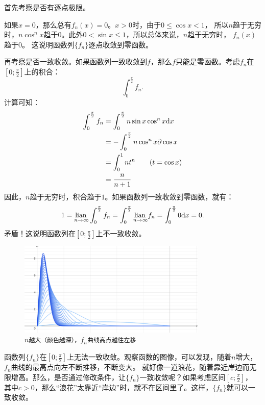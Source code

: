 \documentclass[12pt,UTF8]{ctexbook}
\begin{document}
\begin{so}
    首先考察是否有逐点极限。

    如果$x = 0$，那么总有$f_n(x) = 0$。$x > 0$时，由于$0\leqslant\cos{x}<1$，
    所以$n$趋于无穷时，$n\cos^n{x}$趋于$0$。此外$0 < \sin{x} \leqslant 1$，所以总体来说，$n$趋于无穷时，
    $f_n(x)$趋于$0$。
    这说明函数列$\{f_n\}$逐点收敛到零函数。

    再考察是否一致收敛。如果函数列一致收敛到$f$，那么$f$只能是零函数。考虑$f_n$在$\left[0;\frac{\pi}{2}\right]$上的积合：
    $$ \int_{0}^{\frac{\pi}{2}} f_n.$$
    计算可知：
    \begin{align*}
        \int_{0}^{\frac{\pi}{2}} f_n &= \int_{0}^{\frac{\pi}{2}} n\sin{x}\cos^n{x} \mathrm{d}x \\
        &= -\int_{0}^{\frac{\pi}{2}} n\cos^n{x} \partial \cos{x} \\
        &= \int_{0}^{1} n t^n \tag{$t = \cos{x}$} \\
        &= \frac{n}{n + 1}
    \end{align*}
    因此，$n$趋于无穷时，积合趋于$1$。如果函数列一致收敛到零函数，就有：
    $$ 1 = \underset{n\to\infty}{\operatorname{lian}\,} \int_{0}^{\frac{\pi}{2}} f_n = \int_{0}^{\frac{\pi}{2}} \underset{n\to\infty}{\operatorname{lian}\,} f_n = \int_{0}^{\frac{\pi}{2}} 0\mathrm{d}x = 0.$$
    矛盾！这说明函数列在$\left[0;\frac{\pi}{2}\right]$上不一致收敛。
\end{so}

\begin{figure}[h] %
    \centering
    \includegraphics[width=0.8\textwidth]{tu/一致收敛1.png}
    \caption*{$n$\texttt{越大（颜色越深），}$f_n$\texttt{曲线高点越往左移}}
\end{figure}

函数列$\{f_n\}$在$\left[0;\frac{\pi}{2}\right]$上无法一致收敛。观察函数的图像，可以发现，随着$n$增大，$f_n$曲线的最高点向左不断推移，不断变大。
就好像一道浪花，随着靠近岸边而无限增高。那么，是否通过修改条件，让$\{f_n\}$一致收敛呢？如果考虑区间$\left[c;\frac{\pi}{2}\right]$，
其中$c>0$，那么“浪花”太靠近“岸边”时，就不在区间里了。这样，$\{f_n\}$就可以一致收敛。
\end{document}
